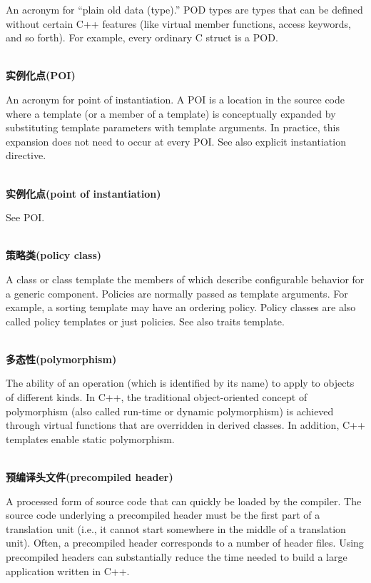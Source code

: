 An acronym for “plain old data (type).” POD types are types that can be defined without certain C++ features (like virtual member functions, access keywords, and so forth). For example, every ordinary C struct is a POD.

\hspace*{\fill} \\ %
\noindent
\textbf{实例化点(POI)}

An acronym for point of instantiation. A POI is a location in the source code where a template (or a member of a template) is conceptually expanded by substituting template parameters with template arguments. In practice, this expansion does not need to occur at every POI. See also explicit instantiation directive.

\hspace*{\fill} \\ %
\noindent
\textbf{实例化点(point of instantiation)}

See POI.

\hspace*{\fill} \\ %
\noindent
\textbf{策略类(policy class)}

A class or class template the members of which describe configurable behavior for a generic component. Policies are normally passed as template arguments. For example, a sorting template may have an ordering policy. Policy classes are also called policy templates or just policies. See also traits template.

\hspace*{\fill} \\ %
\noindent
\textbf{多态性(polymorphism)}

The ability of an operation (which is identified by its name) to apply to objects of different kinds. In C++, the traditional object-oriented concept of polymorphism (also called run-time or dynamic polymorphism) is achieved through virtual functions that are overridden in derived classes. In addition, C++ templates enable static polymorphism.

\hspace*{\fill} \\ %
\noindent
\textbf{预编译头文件(precompiled header)}

A processed form of source code that can quickly be loaded by the compiler. The source code underlying a precompiled header must be the first part of a translation unit (i.e., it cannot start somewhere in the middle of a translation unit). Often, a precompiled header corresponds to a number of header files. Using precompiled headers can substantially reduce the time needed to build a large application written in C++.


